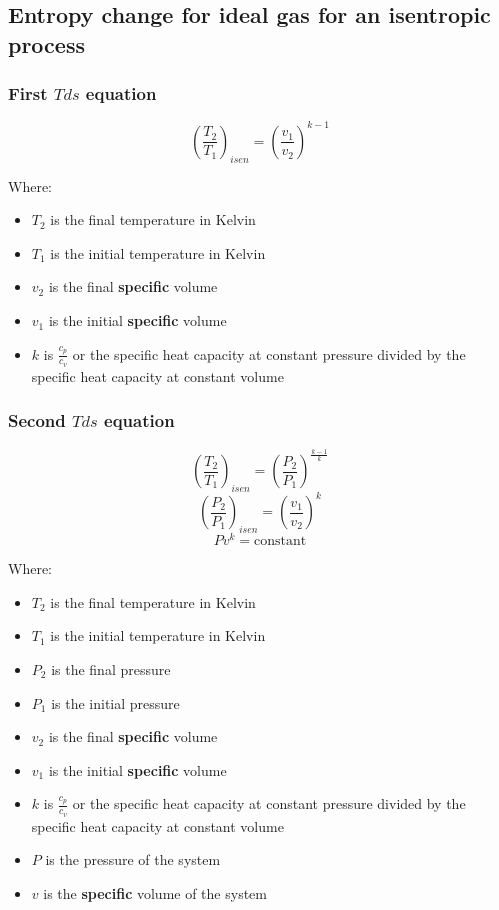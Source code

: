 \documentclass[11pt]{article}
\begin{document}
\subsection{Entropy change for ideal gas for an isentropic process}
\label{sec:orga5a7cee}

\subsubsection{First \(T ds\) equation}
\label{sec:org7dd2a30}
\[\left(\frac{T_2}{T_1} \right)_{isen} = \left(\frac{v_1}{v_2} \right)^{k - 1}\]

Where:
\begin{itemize}
\item \(T_2\) is the final temperature in Kelvin
\item \(T_1\) is the initial temperature in Kelvin
\item \(v_2\) is the final \textbf{specific} volume
\item \(v_1\) is the initial \textbf{specific} volume
\item \(k\) is \(\frac{c_p}{c_v}\) or the specific heat capacity at constant pressure divided by the specific heat capacity at constant volume
\end{itemize}

\subsubsection{Second \(T ds\) equation}
\label{sec:org328a463}
\[\left(\frac{T_2}{T_1} \right)_{isen} = \left(\frac{P_2}{P_1} \right)^{\frac{k - 1}{k}}\]
\[\left(\frac{P_2}{P_1} \right)_{isen} = \left(\frac{v_1}{v_2} \right)^{k}\]
\[Pv^{k} = \text{constant}\]

Where:
\begin{itemize}
\item \(T_2\) is the final temperature in Kelvin
\item \(T_1\) is the initial temperature in Kelvin
\item \(P_2\) is the final pressure
\item \(P_1\) is the initial pressure
\item \(v_2\) is the final \textbf{specific} volume
\item \(v_1\) is the initial \textbf{specific} volume
\item \(k\) is \(\frac{c_p}{c_v}\) or the specific heat capacity at constant pressure divided by the specific heat capacity at constant volume
\item \(P\) is the pressure of the system
\item \(v\) is the \textbf{specific} volume of the system
\end{itemize}
\end{document}

